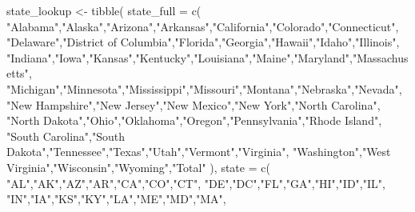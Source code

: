 \documentclass[
  letterpaper,
  DIV=11,
  numbers=noendperiod]{scrartcl}
\newenvironment{Shaded}{\begin{snugshade}}{\end{snugshade}}
\newcommand{\AttributeTok}[1]{\textcolor[rgb]{0.40,0.45,0.13}{#1}}
\newcommand{\FunctionTok}[1]{\textcolor[rgb]{0.28,0.35,0.67}{#1}}
\newcommand{\NormalTok}[1]{\textcolor[rgb]{0.00,0.23,0.31}{#1}}
\newcommand{\OtherTok}[1]{\textcolor[rgb]{0.00,0.23,0.31}{#1}}
\newcommand{\StringTok}[1]{\textcolor[rgb]{0.13,0.47,0.30}{#1}}
\begin{document}
\begin{Shaded}
\begin{Highlighting}[]
\NormalTok{state\_lookup }\OtherTok{\textless{}{-}} \FunctionTok{tibble}\NormalTok{(}
  \AttributeTok{state\_full =} \FunctionTok{c}\NormalTok{(}
    \StringTok{"Alabama"}\NormalTok{,}\StringTok{"Alaska"}\NormalTok{,}\StringTok{"Arizona"}\NormalTok{,}\StringTok{"Arkansas"}\NormalTok{,}\StringTok{"California"}\NormalTok{,}\StringTok{"Colorado"}\NormalTok{,}\StringTok{"Connecticut"}\NormalTok{,}
    \StringTok{"Delaware"}\NormalTok{,}\StringTok{"District of Columbia"}\NormalTok{,}\StringTok{"Florida"}\NormalTok{,}\StringTok{"Georgia"}\NormalTok{,}\StringTok{"Hawaii"}\NormalTok{,}\StringTok{"Idaho"}\NormalTok{,}\StringTok{"Illinois"}\NormalTok{,}
    \StringTok{"Indiana"}\NormalTok{,}\StringTok{"Iowa"}\NormalTok{,}\StringTok{"Kansas"}\NormalTok{,}\StringTok{"Kentucky"}\NormalTok{,}\StringTok{"Louisiana"}\NormalTok{,}\StringTok{"Maine"}\NormalTok{,}\StringTok{"Maryland"}\NormalTok{,}\StringTok{"Massachusetts"}\NormalTok{,}
    \StringTok{"Michigan"}\NormalTok{,}\StringTok{"Minnesota"}\NormalTok{,}\StringTok{"Mississippi"}\NormalTok{,}\StringTok{"Missouri"}\NormalTok{,}\StringTok{"Montana"}\NormalTok{,}\StringTok{"Nebraska"}\NormalTok{,}\StringTok{"Nevada"}\NormalTok{,}
    \StringTok{"New Hampshire"}\NormalTok{,}\StringTok{"New Jersey"}\NormalTok{,}\StringTok{"New Mexico"}\NormalTok{,}\StringTok{"New York"}\NormalTok{,}\StringTok{"North Carolina"}\NormalTok{,}
    \StringTok{"North Dakota"}\NormalTok{,}\StringTok{"Ohio"}\NormalTok{,}\StringTok{"Oklahoma"}\NormalTok{,}\StringTok{"Oregon"}\NormalTok{,}\StringTok{"Pennsylvania"}\NormalTok{,}\StringTok{"Rhode Island"}\NormalTok{,}
    \StringTok{"South Carolina"}\NormalTok{,}\StringTok{"South Dakota"}\NormalTok{,}\StringTok{"Tennessee"}\NormalTok{,}\StringTok{"Texas"}\NormalTok{,}\StringTok{"Utah"}\NormalTok{,}\StringTok{"Vermont"}\NormalTok{,}\StringTok{"Virginia"}\NormalTok{,}
    \StringTok{"Washington"}\NormalTok{,}\StringTok{"West Virginia"}\NormalTok{,}\StringTok{"Wisconsin"}\NormalTok{,}\StringTok{"Wyoming"}\NormalTok{,}\StringTok{"Total"}
\NormalTok{  ),}
  \AttributeTok{state =} \FunctionTok{c}\NormalTok{(}
    \StringTok{"AL"}\NormalTok{,}\StringTok{"AK"}\NormalTok{,}\StringTok{"AZ"}\NormalTok{,}\StringTok{"AR"}\NormalTok{,}\StringTok{"CA"}\NormalTok{,}\StringTok{"CO"}\NormalTok{,}\StringTok{"CT"}\NormalTok{,}
    \StringTok{"DE"}\NormalTok{,}\StringTok{"DC"}\NormalTok{,}\StringTok{"FL"}\NormalTok{,}\StringTok{"GA"}\NormalTok{,}\StringTok{"HI"}\NormalTok{,}\StringTok{"ID"}\NormalTok{,}\StringTok{"IL"}\NormalTok{,}
    \StringTok{"IN"}\NormalTok{,}\StringTok{"IA"}\NormalTok{,}\StringTok{"KS"}\NormalTok{,}\StringTok{"KY"}\NormalTok{,}\StringTok{"LA"}\NormalTok{,}\StringTok{"ME"}\NormalTok{,}\StringTok{"MD"}\NormalTok{,}\StringTok{"MA"}\NormalTok{,}

\end{Highlighting}
\end{Shaded}
\end{document}
